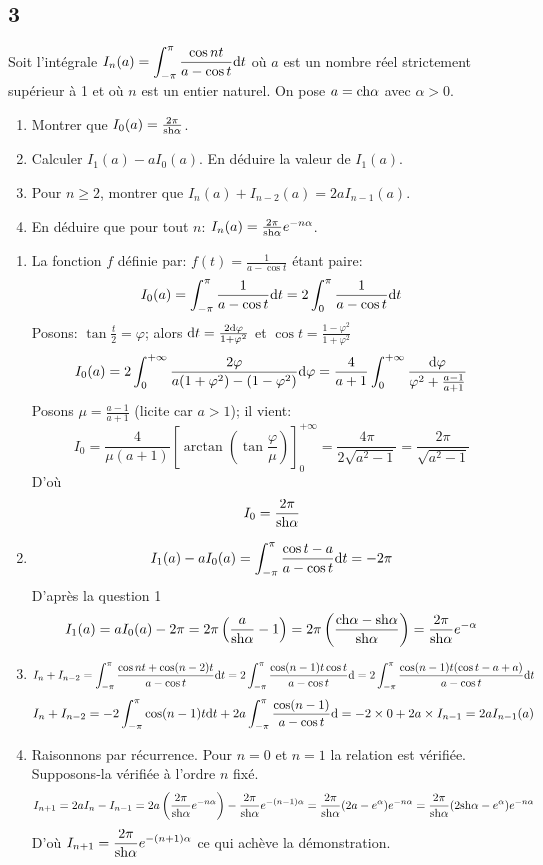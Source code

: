 \documentclass{article}[11pt]
\def \de {{\rm d}}
\def \ch {{\rm ch}}
\def \sh {{\rm sh}}
\begin{document}
\subsection*{3}
{\color{blue}
Soit l'intégrale $I_n(a)=\displaystyle \int_{-\pi}^{\pi}\frac{\cos nt}{a-\cos t}\de t$ où $a$ est un nombre réel strictement supérieur à 1 et où $n$ est un entier naturel. On pose $a=\ch \alpha$ avec $\alpha>0$.
\begin{enumerate}
\item Montrer que $I_0(a)=\frac{2\pi}{\sh\alpha}$.
\item Calculer $I_1(a)-aI_0(a)$. En déduire la valeur de $I_1(a)$.
\item Pour $n\geq 2$, montrer que $I_n(a)+I_{n-2}(a)=2aI_{n-1}(a)$.
\item En déduire que pour tout $n$: $I_n(a)=\frac{2\pi}{\sh\alpha}e^{-n\alpha}$.
\end{enumerate}
}
\begin{enumerate}
\item La fonction $f$ définie par: $f(t)=\frac{1}{a-\cos t}$ étant paire:
\[I_0(a)=\int_{-\pi}^{\pi}\frac{1}{a-\cos t}\de t=2\int_{0}^{\pi}\frac{1}{a-\cos t}\de t\]
Posons: $\tan\frac t2=\varphi$; alors $\de t=\frac{2\de\varphi}{1+\varphi^2}$ et $\cos t=\frac{1-\varphi^2}{1+\varphi^2}$
\[I_0(a)=2\int_{0}^{+\infty}\frac{2\varphi}{a(1+\varphi^2)-(1-\varphi^2)}\de \varphi=\frac{4}{a+1}\int_{0}^{+\infty}\frac{\de \varphi}{\varphi^2+\frac{a-1}{a+1}}\]
Posons $\mu=\frac{a-1}{a+1}$ (licite car $a>1$); il vient:
\[I_0=\frac{4}{\mu(a+1)}\left[\arctan\left(\tan\frac{\varphi}{\mu}\right)\right]_{0}^{+\infty}=\frac{4\pi}{2\sqrt{a^2-1}}=\frac{2\pi}{\sqrt{a^2-1}}\]
D'où 
\[I_0=\frac{2\pi}{\sh\alpha}\]
\item \[I_1(a)-aI_0(a)=\int_{-\pi}^{\pi}\frac{\cos t -a}{a-\cos t}\de t=-2\pi\]
D'après la question 1
\[I_1(a)=aI_0(a)-2\pi=2\pi\left(\frac{a}{\sh\alpha}-1\right)=2\pi\left(\frac{\ch\alpha-\sh\alpha}{\sh\alpha}\right)=\frac{2\pi}{\sh\alpha}e^{-\alpha}\]
\item \[I_n+I_{n-2}=\int_{-\pi}^{\pi}\frac{\cos nt+\cos (n-2)t}{a-\cos t}\de t=2 \int_{-\pi}^{\pi}\frac{\cos (n-1)t\cos t}{a-\cos t}\de =2 \int_{-\pi}^{\pi}\frac{\cos (n-1)t(\cos t-a+a)}{a-\cos t}\de t\]
 \[I_n+I_{n-2}=-2\int_{-\pi}^{\pi}\cos (n-1)t\de t+2 a\int_{-\pi}^{\pi}\frac{\cos (n-1)}{a-\cos t}\de =-2\times 0+2a\times I_{n-1}=2aI_{n-1}(a)\]
 \item Raisonnons par récurrence. Pour $n=0$ et $n=1$ la relation est vérifiée. Supposons-la vérifiée à l'ordre $n$ fixé.
 \[I_{n+1}=2aI_n-I_{n-1}=2a\left(\frac{2\pi}{\sh\alpha}e^{-n\alpha}\right)-\frac{2\pi}{\sh\alpha}e^{-(n-1)\alpha}=\frac{2\pi}{\sh\alpha}(2a-e^\alpha)e^{-n\alpha}=\frac{2\pi}{\sh\alpha}(2\sh\alpha-e^\alpha)e^{-n\alpha}\]
 D'où $I_{n+1}=\displaystyle \frac{2\pi}{\sh\alpha}e^{-(n+1)\alpha}$ ce qui achève la démonstration.
\end{enumerate}
\end{document}
